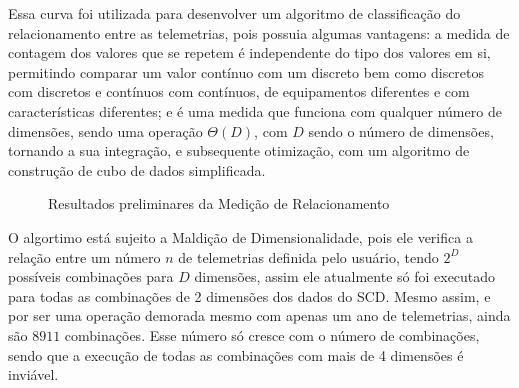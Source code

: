 Essa curva foi utilizada para desenvolver um algoritmo de classificação do relacionamento entre as telemetrias, pois possuia algumas vantagens: a medida de contagem dos valores que se repetem é independente do tipo dos valores em si, permitindo comparar um valor contínuo com um discreto bem como discretos com discretos e contínuos com contínuos, de equipamentos diferentes e com características diferentes; e é uma medida que funciona com qualquer número de dimensões, sendo uma operação $\Theta(D)$, com $D$ sendo o número de dimensões, tornando a sua integração, e subsequente otimização, com um algoritmo de construção de cubo de dados simplificada.

\begin{figure}[ht]
	\caption{Resultados preliminares da Medição de Relacionamento}
	\vspace{6mm}
	\begin{center}
	\end{center}
	\vspace{4mm}
	\label{fig:similarityresults}
\end{figure}

O algortimo está sujeito a Maldição de Dimensionalidade, pois ele verifica a relação entre um número $n$ de telemetrias definida pelo usuário, tendo $2^D$ possíveis combinações para $D$ dimensões, assim ele atualmente só foi executado para todas as combinações de 2 dimensões dos dados do SCD.
Mesmo assim, e por ser uma operação demorada mesmo com apenas um ano de telemetrias, ainda são $8911$ combinações.
Esse número só cresce com o número de combinações, sendo que a execução de todas as combinações com mais de 4 dimensões é inviável.

